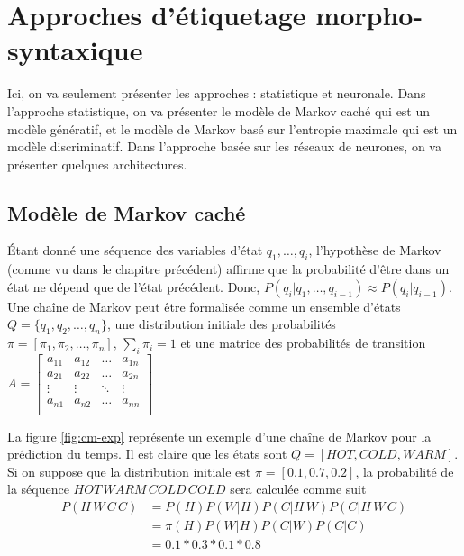 \documentclass{KodeBook}
\begin{document}
\section{Approches d'étiquetage morpho-syntaxique}

Ici, on va seulement présenter les approches : statistique et neuronale.
Dans l'approche statistique, on va présenter le modèle de Markov caché qui  est un modèle génératif, et le modèle de Markov basé sur l'entropie maximale qui est un modèle discriminatif. 
Dans l'approche basée sur les réseaux de neurones, on va présenter quelques architectures.

\subsection{Modèle de Markov caché}

Étant donné une séquence des variables d'état $q_1, \ldots, q_i$, l'hypothèse de Markov (comme vu dans le chapitre précédent) affirme que la probabilité d'être dans un état ne dépend que de l'état précédent.
Donc, $ P(q_i | q_1, \ldots, q_{i-1}) \approx P(q_i | q_{i-1}) $.
Une chaîne de Markov peut être formalisée comme un ensemble d'états $Q = \{q_1, q_2, \ldots, q_n\}$, une distribution initiale des probabilités $\pi = [\pi_1, \pi_2, \ldots, \pi_n ],\, \sum_i \pi_i = 1$ et une matrice des  probabilités de transition
$
A = \begin{bmatrix}%
a_{11} & a_{12} & \ldots & a_{1n} \\
a_{21} & a_{22} & \ldots & a_{2n} \\
\vdots & \vdots & \ddots & \vdots \\
a_{n1} & a_{n2} & \ldots & a_{nn} \\
\end{bmatrix}
$

La figure \ref{fig:cm-exp} représente un exemple d'une chaîne de Markov pour la prédiction du temps. 
Il est claire que les états sont $Q = [HOT, COLD, WARM]$. 
Si on suppose que la distribution initiale est $\pi = [0.1, 0.7, 0.2]$, la probabilité de la séquence $HOT\, WARM\, COLD\, COLD$ sera calculée comme suit 
\begin{align*}
P(H\, W\, C\, C) & = P(H) P(W | H) P(C | H\, W) P(C | H\, W\, C) \\
& = \pi(H) P(W | H) P(C | W) P(C | C) \\
& = 0.1 * 0.3 * 0.1 * 0.8 \\
\end{align*}
\end{document}
